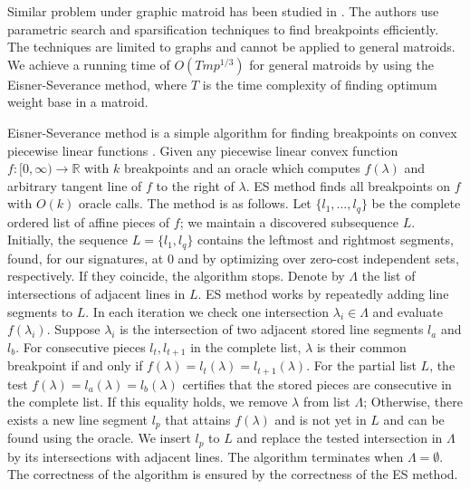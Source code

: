 \documentclass{article}
\newcommand{\R}{\mathbb{R}}
\begin{document}
Similar problem under graphic matroid has been studied in \cite{agarwal_parametric_1998}. The authors use parametric search and sparsification techniques to find breakpoints efficiently. 
The techniques are limited to graphs and cannot be applied to general matroids.
We achieve a running time of $O(Tmp^{1/3})$ for general matroids by using the Eisner-Severance method, where $T$ is the time complexity of finding optimum weight base in a matroid.


Eisner-Severance method is a simple algorithm for finding breakpoints on convex piecewise linear functions \cite{eisner_mathematical_1976}.
Given any piecewise linear convex function $f:[0,\infty)\to\R$ with $k$ breakpoints and an oracle which computes $f(\lambda)$ and arbitrary tangent line of $f$ to the right of $\lambda$.
ES method finds all breakpoints on $f$ with $O(k)$ oracle calls. The method is as follows.
Let $\{l_1,\ldots,l_q\}$ be the complete ordered list of affine pieces of $f$; we maintain a discovered subsequence $L$.
Initially, the sequence $L=\{l_1,l_q\}$ contains the leftmost and rightmost segments, found, for our signatures, at $0$ and by optimizing over zero-cost independent sets, respectively. If they coincide, the algorithm stops.
Denote by $\Lambda$ the list of intersections of adjacent lines in $L$.
ES method works by repeatedly adding line segments to $L$. In each iteration we check one intersection $\lambda_i\in\Lambda$ and evaluate $f(\lambda_i)$. Suppose $\lambda_i$ is the intersection of two adjacent stored line segments $l_a$ and $l_b$.
For consecutive pieces $l_t,l_{t+1}$ in the complete list, $\lambda$ is their common breakpoint if and only if $f(\lambda)=l_t(\lambda)=l_{t+1}(\lambda)$. For the partial list $L$, the test $f(\lambda)=l_a(\lambda)=l_b(\lambda)$ certifies that the stored pieces are consecutive in the complete list. If this equality holds, we remove $\lambda$ from list $\Lambda$; Otherwise, there exists a new line segment $l_p$ that attains $f(\lambda)$ and is not yet in $L$ and can be found using the oracle. We insert $l_p$ to $L$ and replace the tested intersection in $\Lambda$ by its intersections with adjacent lines. The algorithm terminates when $\Lambda=\emptyset$. The correctness of the algorithm is ensured by the correctness of the ES method.
\end{document}
